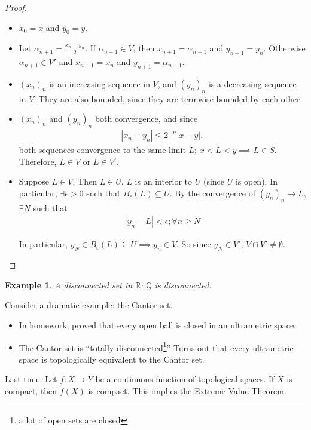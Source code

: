 \documentclass[12pt]{article}
\newtheorem*{example}{Example}
\newcommand{\RR}{\mathbb{R}}
\newcommand{\eps}{\epsilon}
\begin{document}
\begin{proof}
  \begin{itemize}
    \item $x_0 = x$ and $y_0 = y$.
    \item Let $\alpha_{n+1} = \frac{x_n + y_n}{2}.$  If $\alpha_{n+1} \in V$, then $x_{n+1} = \alpha_{n+1}$ and $y_{n+1} = y_n$.  Otherwise $\alpha_{n+1} \in V'$ and $x_{n+1} = x_n$ and $y_{n+1} = \alpha_{n+1}$.
    \item $(x_n)_n$ is an increasing sequence in $V$, and $(y_n)_n$ is a decreasing sequence in $V$.  They are also bounded, since they are termwise bounded by each other.
    \item $(x_n)_n$ and $(y_n)_n$ both convergence, and since
      \begin{align*}
        |x_n - y_n| \leq 2^{-n} |x - y|,
      \end{align*}
      both sequences convergence to the same limit $L$; $x < L < y \implies L \in S$.  Therefore, $L \in V$ or $L \in V'$.

    \item Suppose $L \in V$.  Then $L \in U$.  $L$ is an interior to $U$ (since $U$ is open).  In particular, $\exists \eps > 0$ such that $B_{\eps}(L) \subseteq U$.  By the convergence of $(y_n)_n \to L$, $\exists N$ such that
      \begin{align*}
        |y_n - L| < \eps; \forall n \geq N
      \end{align*}

      In particular, $y_N \in B_{\eps}(L) \subseteq U \implies y_n \in V$.  So since $y_N \in V'$, $V \cap V' \neq \emptyset$.
  \end{itemize}
\end{proof}

\begin{example}
  A disconnected set in $\RR$: $\mathbb{Q}$ is disconnected.
\end{example}

Consider a dramatic example: the Cantor set.

\begin{itemize}
  \item In homework, proved that every open ball is closed in an ultrametric space.
  \item The Cantor set is ``totally disconnected\footnote{a lot of open sets are closed}''  Turns out that every ultrametric space is topologically equivalent to the Cantor set.
\end{itemize}

Last time: Let $f: X \to Y$ be a continuous function of topological spaces.  If $X$ is compact, then $f(X)$ is compact.  This implies the Extreme Value Theorem.
\end{document}
